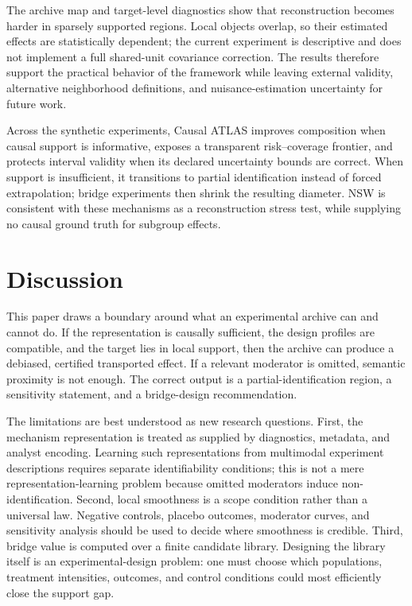 \documentclass[11pt]{article}
\numberwithin{equation}{section}
\newcommand{\1}{\mathbf 1}
\begin{document}
The archive map and target-level diagnostics show that reconstruction becomes harder in sparsely supported regions.  Local objects overlap, so their estimated effects are statistically dependent; the current experiment is descriptive and does not implement a full shared-unit covariance correction.  The results therefore support the practical behavior of the framework while leaving external validity, alternative neighborhood definitions, and nuisance-estimation uncertainty for future work.

Across the synthetic experiments, Causal ATLAS improves composition when causal support is informative, exposes a transparent risk--coverage frontier, and protects interval validity when its declared uncertainty bounds are correct.  When support is insufficient, it transitions to partial identification instead of forced extrapolation; bridge experiments then shrink the resulting diameter.  NSW is consistent with these mechanisms as a reconstruction stress test, while supplying no causal ground truth for subgroup effects.



\section{Discussion}
\label{sec:discussion}

This paper draws a boundary around what an experimental archive can and cannot do.  If the representation is causally sufficient, the design profiles are compatible, and the target lies in local support, then the archive can produce a debiased, certified transported effect.  If a relevant moderator is omitted, semantic proximity is not enough.  The correct output is a partial-identification region, a sensitivity statement, and a bridge-design recommendation.

The limitations are best understood as new research questions.  First, the mechanism representation is treated as supplied by diagnostics, metadata, and analyst encoding.  Learning such representations from multimodal experiment descriptions requires separate identifiability conditions; this is not a mere representation-learning problem because omitted moderators induce non-identification.  Second, local smoothness is a scope condition rather than a universal law.  Negative controls, placebo outcomes, moderator curves, and sensitivity analysis should be used to decide where smoothness is credible.  Third, bridge value is computed over a finite candidate library.  Designing the library itself is an experimental-design problem: one must choose which populations, treatment intensities, outcomes, and control conditions could most efficiently close the support gap.
\end{document}
